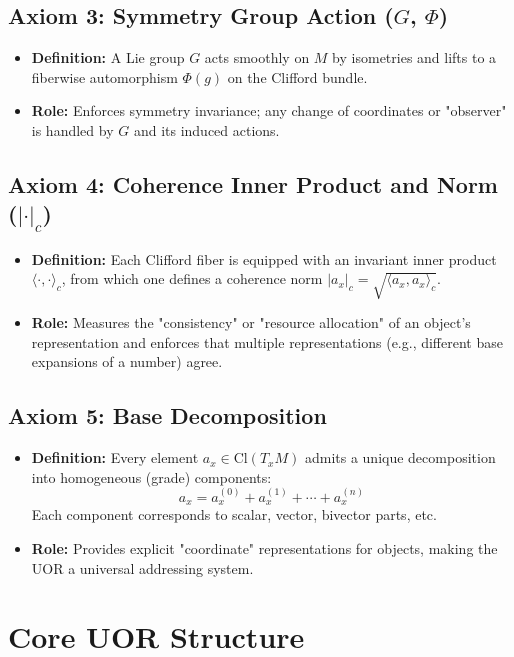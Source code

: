 \documentclass[12pt]{article}
\begin{document}
\subsection{Axiom 3: Symmetry Group Action (\texorpdfstring{$G$, $\Phi$}{G, Phi})}
\begin{itemize}
    \item \textbf{Definition:} A Lie group \( G \) acts smoothly on \( M \) by isometries and lifts to a fiberwise automorphism \( \Phi(g) \) on the Clifford bundle.
    \item \textbf{Role:} Enforces symmetry invariance; any change of coordinates or "observer" is handled by \( G \) and its induced actions.
\end{itemize}

\subsection{Axiom 4: Coherence Inner Product and Norm (\texorpdfstring{$|\cdot|_c$}{|∙|c})}
\begin{itemize}
    \item \textbf{Definition:} Each Clifford fiber is equipped with an invariant inner product \( \langle \cdot, \cdot \rangle_c \), from which one defines a coherence norm \( |a_x|_c = \sqrt{\langle a_x, a_x \rangle_c} \).
    \item \textbf{Role:} Measures the "consistency" or "resource allocation" of an object’s representation and enforces that multiple representations (e.g., different base expansions of a number) agree.
\end{itemize}

\subsection{Axiom 5: Base Decomposition}
\begin{itemize}
    \item \textbf{Definition:} Every element \( a_x \in \mathrm{Cl}(T_x M) \) admits a unique decomposition into homogeneous (grade) components:
    \[
    a_x = a_x^{(0)} + a_x^{(1)} + \cdots + a_x^{(n)}
    \]
    Each component corresponds to scalar, vector, bivector parts, etc.
    \item \textbf{Role:} Provides explicit "coordinate" representations for objects, making the UOR a universal addressing system.
\end{itemize}

\section{Core UOR Structure}
\end{document}
